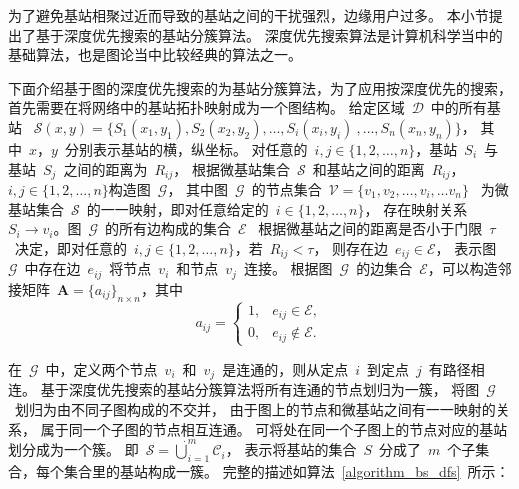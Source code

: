 为了避免基站相聚过近而导致的基站之间的干扰强烈，边缘用户过多。
本小节提出了基于深度优先搜索的基站分簇算法。
深度优先搜索算法是计算机科学当中的基础算法，也是图论当中比较经典的算法之一。

下面介绍基于图的深度优先搜索的为基站分簇算法，为了应用按深度优先的搜索，首先需要在将网络中的基站拓扑映射成为一个图结构。
给定区域~$\mathcal{D}$~中的所有基站
~$\mathcal{S}(x,y)=\{S_1(x_1,y_1), S_2(x_2,y_2),\dots,S_i(x_i,y_i)~,\dots,S_n(x_n,y_n)\}$，
其中~$x$，$y$~分别表示基站的横，纵坐标。
对任意的~$i,j\in\{1,2,\dots,n\}$，基站~$S_i$~与基站~$S_j$~之间的距离为~$R_{ij}$，
根据微基站集合~$\mathcal{S}$~和基站之间的距离~$R_{ij}$，$i,j \in\{1,2,\dots,n\}$构造图~$\mathcal{G}$，
其中图~$\mathcal{G}$~的节点集合~$\mathcal{V}=\{v_1,v_2,\dots,v_i,\dots v_n\}$~
为微基站集合~$\mathcal{S}$~的一一映射，即对任意给定的~$i\in\{1,2,\dots,n\}$，
存在映射关系~$S_i \rightarrow v_i$。图~$\mathcal{G}$~的所有边构成的集合~$\mathcal{E}$~
根据微基站之间的距离是否小于门限~$\tau$~决定，即对任意的~$i,j\in\{1,2,\dots,n\}$，若~$R_{ij}<\tau$，
则存在边~$e_{ij}\in\mathcal{E}$，
表示图~$\mathcal{G}$~中存在边~$e_{ij}$~将节点~$v_i$~和节点~$v_j$~连接。
根据图~$\mathcal{G}$~的边集合~$\mathcal{E}$，可以构造邻接矩阵~$\mathbf{A}=\{a_{ij}\}_{n\times n}$，其中
\begin{equation}
a_{ij}=
\begin{cases}
1, & e_{ij}\in \mathcal{E}, \\
0, & e_{ij}\notin \mathcal{E}.
\end{cases}
\end{equation}

在~$\mathcal{G}$~中，定义两个节点~$v_i$~和~$v_j$~是连通的，则从定点~$i$~到定点~$j$~有路径相连。
基于深度优先搜索的基站分簇算法将所有连通的节点划归为一簇，
将图~$\mathcal{G}$~划归为由不同子图构成的不交并，
由于图上的节点和微基站之间有一一映射的关系，
属于同一个子图的节点相互连通。
可将处在同一个子图上的节点对应的基站划分成为一个簇。
即~$\mathcal{S} = \dot{\bigcup\nolimits}_{i=1}^{m}\mathcal{C}_i$，
表示将基站的集合~$S$~分成了~$m$~个子集合，每个集合里的基站构成一簇。
完整的描述如算法~\ref{algorithm_bs_dfs}~所示：


